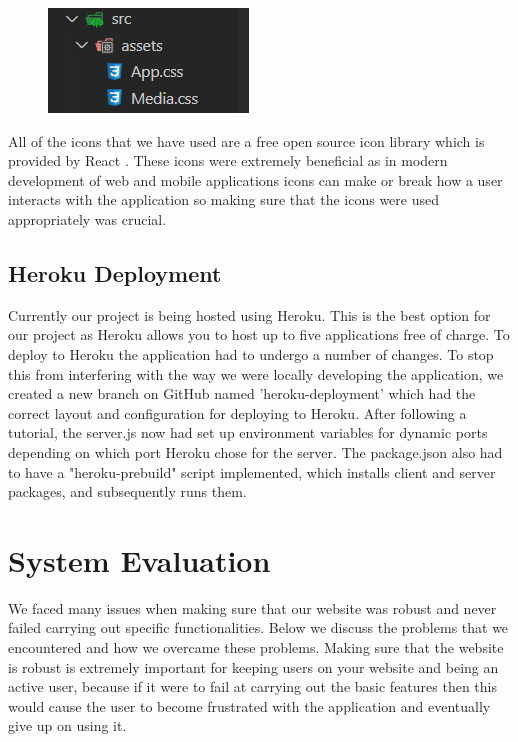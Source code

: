 \begin{figure}[H]
  \centering
  \includegraphics[scale=1]{img/assets.PNG}
  \label{fig:Internal Assets.}
\end{figure}

All of the icons that we have used are a free open source icon library which is provided by React \cite{react-icons}. These icons were extremely beneficial as in modern development of web and mobile applications icons can make or break how a user interacts with the application so making sure that the icons were used appropriately was crucial. 

\section{Heroku Deployment}

Currently our project is being hosted using Heroku. This is the best option for our project as Heroku allows you to host up to five applications free of charge. To deploy to Heroku the application had to undergo a number of changes. To stop this from interfering with the way we were locally developing the application, we created a new branch on GitHub named 'heroku-deployment' which had the correct layout and configuration for deploying to Heroku. After following a tutorial, the server.js now had set up environment variables for dynamic ports depending on which port Heroku chose for the server. The package.json also had to have a "heroku-prebuild" script implemented, which installs client and server packages, and subsequently runs them\cite{herokudeployment}.

\chapter{System Evaluation}

We faced many issues when making sure that our website was robust and never failed carrying out specific functionalities. Below we discuss the problems that we encountered and how we overcame these problems. Making sure that the website is robust is extremely important for keeping users on your website and being an active user, because if it were to fail at carrying out the basic features then this would cause the user to become frustrated with the application and eventually give up on using it.
\newline

